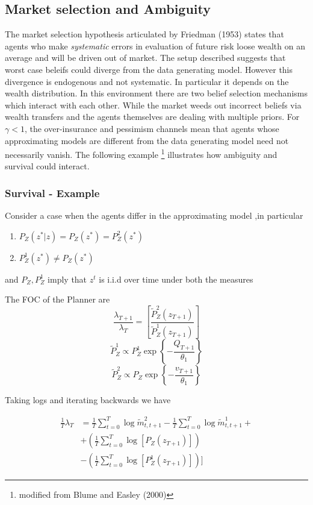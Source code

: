 \documentclass[12pt]{article}
\begin{document}
\subsection{Market selection and Ambiguity}
The market selection hypothesis articulated by Friedman (1953) states that agents who make \emph{systematic} errors in evaluation of future risk loose wealth on an average and will be driven out of market. The setup described suggests that worst case beleifs could diverge from the data generating model. However this divergence is endogenous and not systematic. In particular it depends on the wealth distribution. In this environment there are two belief selection mechanisms which interact with each other. While the market weeds out incorrect beliefs via wealth transfers and the agents themselves are dealing with multiple priors. For $\gamma < 1$, the over-insurance and pessimism channels mean that agents whose approximating models are different from the data generating model need not necessarily vanish. The following example \footnote{modified from Blume and Easley (2000) } illustrates how ambiguity and survival could interact.

\subsubsection{Survival - Example}
Consider a case when the agents differ in the approximating model	,in particular
\begin{enumerate}
\item $P_Z(z^*|z)=P_Z(z^*)=P^2_Z(z^*)$
\item $P_Z^1(z^*) \neq P_Z(z^*)$
\end{enumerate}
and $P_Z,P^1_Z$ imply that $z^t$ is i.i.d over time under both the measures

The FOC of the Planner are 
%
\[\frac{\lambda_{T+1}}{\lambda_{T}} =\left[\frac{\tilde{P}^2_Z(z_{T+1})}{\tilde{P}^1_{Z}(z_{T+1})}\right]\]
\[\tilde{P}^1_Z \propto P^1_Z \exp \left\{-\frac{Q_{T+1}}{\theta_1}\right\}\]
\[\tilde{P}^2_Z \propto P_Z \exp \left\{-\frac{v_{T+1}}{\theta_1}\right\}\]

Taking logs and iterating backwards we have

\begin{eqnarray*}
\frac{1}{T}\lambda_{T}&=\frac{1}{T}\sum_{t=0}^{T}\log\tilde{m}^2_{t,t+1}-\frac{1}{T}\sum_{t=0}^{T}\log \tilde{m}^1_{t,t+1}+\\ &+ \left( \frac{1}{T}\sum_{t=0}^{T}\log[P_Z(z_{T+1})]\right)\\
&- \left( \frac{1}{T}\sum_{t=0}^{T}\log[P^1_Z(z_{T+1})]\right)]
\end{eqnarray*}
\end{document}

